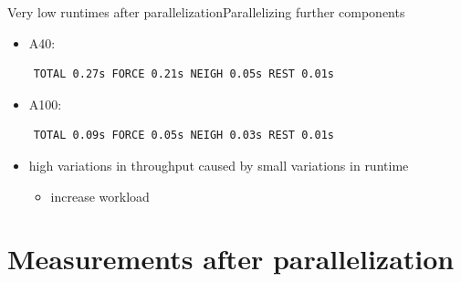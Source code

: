 \documentclass[ignorenonframetext,aspectratio=169]{beamer}
\providecommand{\tightlist}{%
  \setlength{\itemsep}{0pt}\setlength{\parskip}{0pt}}
\begin{document}
\begin{frame}[fragile]{Very low runtimes after parallelization}{Parallelizing further components}
    
    \begin{itemize}
        \tightlist
        \item
        A40:
    \end{itemize}
    
    \begin{verbatim}
    TOTAL 0.27s FORCE 0.21s NEIGH 0.05s REST 0.01s
    \end{verbatim}
    
    \begin{itemize}
        \tightlist
        \item
        A100:
    \end{itemize}
    
    \begin{verbatim}
    TOTAL 0.09s FORCE 0.05s NEIGH 0.03s REST 0.01s
    \end{verbatim}

\begin{itemize}
    \item high variations in throughput caused by small variations in runtime
    \begin{itemize}
        \item increase workload
    \end{itemize}
\end{itemize}    
\end{frame}

\section{Measurements after parallelization}
\end{document}
